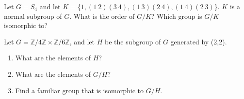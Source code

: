\documentclass[12pt,letterpaper,boxed]{hmcpset}
\begin{document}
\begin{problem}[10.3.1]
Let $ G = S_4 $ and let $ K = \{ 1,(1 \ 2)(3 \ 4),(1 \ 3)(2 \ 4),(1 \ 4)(2 \ 3) \} $. $K$ is a normal subgroup of $G$. What is the order of $G/K$? Which group is $G/K$ isomorphic to? 
\end{problem}

\begin{solution}
\end{solution}

\clearpage

\begin{problem}[10.3.3]
Let $G = \mathbb{Z} / 4\mathbb{Z} \times \mathbb{Z} / 6 \mathbb{Z} $, and let $H$ be the subgroup of $G$ generated by (2,2). 
\begin{enumerate}[label=\alph*]
\item What are the elements of $H$?
\item What are the elements of $G/H$?
\item Find a familiar group that is isomorphic to $G/H$.
\end{enumerate}
\end{problem}

\begin{solution}

\end{solution}
\end{document}
